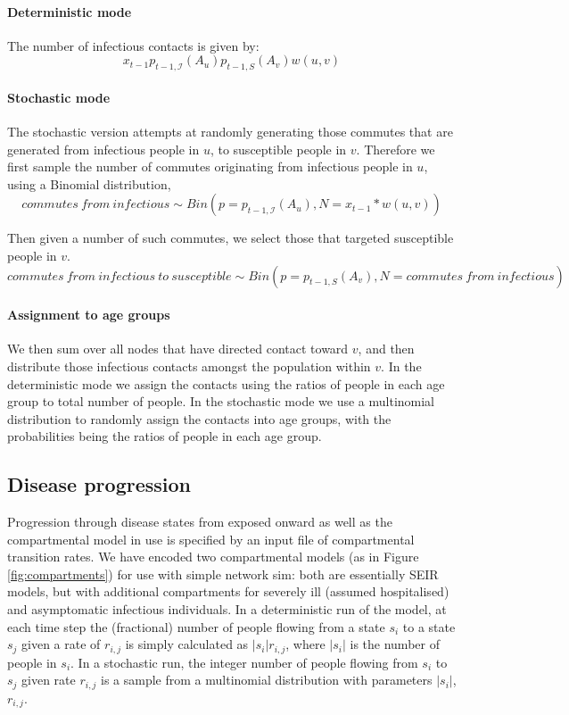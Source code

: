 \documentclass[11pt]{article}
\begin{document}
\paragraph{Deterministic mode}\hfill \break
The number of infectious contacts is given by:
$$x_{t-1} p_{t-1, \mathcal{I}}(A_u) p_{t-1, S}(A_v) w(u, v)$$

\paragraph{Stochastic mode}\hfill \break
The stochastic version attempts at randomly generating those commutes that are generated from infectious people in $u$, to susceptible people in $v$. Therefore we first sample the number of commutes originating from infectious people in $u$, using a Binomial distribution, 
$$commutes \ from \ infectious \sim Bin(p=p_{t-1, \mathcal{I}}(A_u), N=x_{t-1} * w(u, v))$$

Then given a number of such commutes, we select those that targeted susceptible people in $v$.
$$commutes \ from \ infectious \ to \ susceptible \sim Bin(p=p_{t-1, S}(A_v), N=commutes \ from \ infectious)$$

\paragraph{Assignment to age groups}\hfill \break
We then sum over all nodes that have directed contact toward $v$, and then distribute those infectious contacts amongst the population within $v$. In the deterministic mode we assign the contacts using the ratios of people in each age group to total number of people. In the stochastic mode we use a multinomial distribution to randomly assign the contacts into age groups, with the probabilities being the ratios of people in each age group.

\subsection{Disease progression}
Progression through disease states from exposed onward as well as the compartmental model in use is specified by an input file of compartmental transition rates. We have encoded two compartmental models (as in Figure \ref{fig:compartments}) for use with simple network sim: both are essentially SEIR models, but with additional compartments for severely ill (assumed hospitalised) and asymptomatic infectious individuals. In a deterministic run of the model, at each time step the (fractional) number of people flowing from a state $s_i$ to a state $s_j$ given a rate of $r_{i,j}$ is simply calculated as $|s_i|r_{i,j}$, where $|s_i|$ is the number of people in $s_i$.  In a stochastic run, the integer number of people flowing from $s_i$ to $s_j$ given rate $r_{i,j}$ is a sample from a multinomial distribution with parameters $|s_i|$, $r_{i,j}$.
\end{document}
